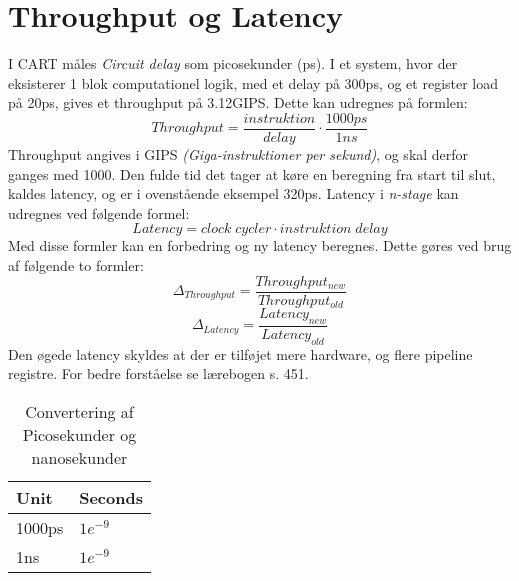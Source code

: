 \section{Throughput og Latency}
I CART måles \textit{Circuit delay} som picosekunder (ps).
I et system, hvor der eksisterer 1 blok computationel logik, med et delay på 300ps, og et register load på 20ps, gives et throughput på 3.12GIPS.
Dette kan udregnes på formlen:
\begin{equation}
    Throughput=\frac{instruktion}{delay}\cdot\frac{1000ps}{1ns}
\end{equation}
Throughput angives i GIPS \textit{(Giga-instruktioner per sekund)}, og skal derfor ganges med 1000.
Den fulde tid det tager at køre en beregning fra start til slut, kaldes latency, og er i ovenstående eksempel 320ps.
Latency i \textit{n-stage} kan udregnes ved følgende formel:
\begin{equation}
    Latency=clock\;cycler\cdot instruktion\;delay
\end{equation}
Med disse formler kan en forbedring og ny latency beregnes.
Dette gøres ved brug af følgende to formler:
\begin{equation}
    \Delta_{Throughput}= \frac{Throughput_{new}}{Throughput_{old}}
\end{equation}
\begin{equation}
    \Delta_{Latency}=\frac{Latency_{new}}{Latency_{old}}
\end{equation}
Den øgede latency skyldes at der er tilføjet mere hardware, og flere pipeline registre.
For bedre forståelse se lærebogen s. 451.
\begin{table}[h!]
    \centering
    \begin{tabular}{ll}
        \hline
        Unit&Seconds\\\hline
        1000ps&$1e^{-9}$\\
        1ns&$1e^{-9}$\\\hline
    \end{tabular}
    \caption{Convertering af Picosekunder og nanosekunder}
\end{table}
